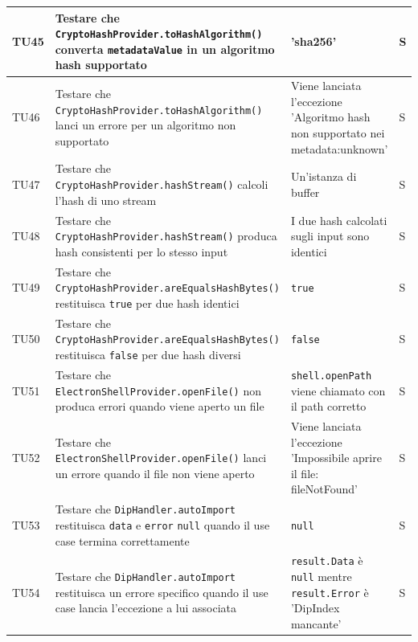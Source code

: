 \documentclass[a4paper,12pt]{article}
\begin{document}
\begin{longtable}{|M{1.2cm}|M{5cm}|M{5cm}|M{1.5cm}|}
            TU45 & Testare che \texttt{CryptoHashProvider.toHashAlgorithm()} converta \texttt{metadataValue} in un algoritmo hash supportato & 'sha256' & S \\
            \hline

            TU46 & Testare che \texttt{CryptoHashProvider.toHashAlgorithm()} lanci un errore per un algoritmo non supportato & Viene lanciata l'eccezione 'Algoritmo hash non supportato nei metadata:unknown' & S \\
            \hline

            TU47 & Testare che \texttt{CryptoHashProvider.hashStream()} calcoli l'hash di uno stream & Un'istanza di buffer & S \\
            \hline

            TU48 & Testare che \texttt{CryptoHashProvider.hashStream()} produca hash consistenti per lo stesso input & I due hash calcolati sugli input sono identici & S \\
            \hline
            
            TU49 & Testare che \texttt{CryptoHashProvider.areEqualsHashBytes()} restituisca \texttt{true} per due hash identici & \texttt{true} & S \\
            \hline
          
            TU50 & Testare che \texttt{CryptoHashProvider.areEqualsHashBytes()} restituisca \texttt{false} per due hash diversi & \texttt{false} & S \\
            \hline

            TU51 & Testare che \texttt{ElectronShellProvider.openFile()} non produca errori quando viene aperto un file & \texttt{shell.openPath} viene chiamato con il path corretto & S \\
            \hline

            TU52 & Testare che \texttt{ElectronShellProvider.openFile()} lanci un errore quando il file non viene aperto & Viene lanciata l'eccezione 'Impossibile aprire il file: fileNotFound' & S \\
            \hline


            TU53 & Testare che \texttt{DipHandler.autoImport} restituisca \texttt{data} e \texttt{error} \texttt{null} quando il use case termina correttamente & \texttt{null} & S \\
            \hline

            TU54 & Testare che \texttt{DipHandler.autoImport} restituisca un errore specifico quando il use case lancia l'eccezione a lui associata & \texttt{result.Data} è \texttt{null} mentre \texttt{result.Error} è 'DipIndex mancante' & S \\
            \hline


\end{longtable}
\end{document}
